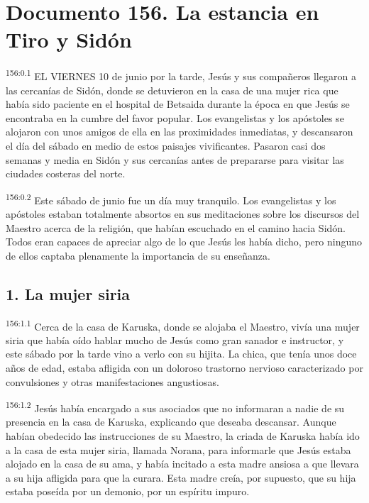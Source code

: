 \chapter{Documento 156. La estancia en Tiro y Sidón}
\par 
\textsuperscript{156:0.1} EL VIERNES 10 de junio por la tarde, Jesús y sus compañeros llegaron a las cercanías de Sidón, donde se detuvieron en la casa de una mujer rica que había sido paciente en el hospital de Betsaida durante la época en que Jesús se encontraba en la cumbre del favor popular. Los evangelistas y los apóstoles se alojaron con unos amigos de ella en las proximidades inmediatas, y descansaron el día del sábado en medio de estos paisajes vivificantes. Pasaron casi dos semanas y media en Sidón y sus cercanías antes de prepararse para visitar las ciudades costeras del norte.

\par 
\textsuperscript{156:0.2} Este sábado de junio fue un día muy tranquilo. Los evangelistas y los apóstoles estaban totalmente absortos en sus meditaciones sobre los discursos del Maestro acerca de la religión, que habían escuchado en el camino hacia Sidón. Todos eran capaces de apreciar algo de lo que Jesús les había dicho, pero ninguno de ellos captaba plenamente la importancia de su enseñanza.

\section*{1. La mujer siria}
\par 
\textsuperscript{156:1.1} Cerca de la casa de Karuska, donde se alojaba el Maestro, vivía una mujer siria que había oído hablar mucho de Jesús como gran sanador e instructor, y este sábado por la tarde vino a verlo con su hijita. La chica, que tenía unos doce años de edad, estaba afligida con un doloroso trastorno nervioso caracterizado por convulsiones y otras manifestaciones angustiosas.

\par 
\textsuperscript{156:1.2} Jesús había encargado a sus asociados que no informaran a nadie de su presencia en la casa de Karuska, explicando que deseaba descansar. Aunque habían obedecido las instrucciones de su Maestro, la criada de Karuska había ido a la casa de esta mujer siria, llamada Norana, para informarle que Jesús estaba alojado en la casa de su ama, y había incitado a esta madre ansiosa a que llevara a su hija afligida para que la curara. Esta madre creía, por supuesto, que su hija estaba poseída por un demonio, por un espíritu impuro.

